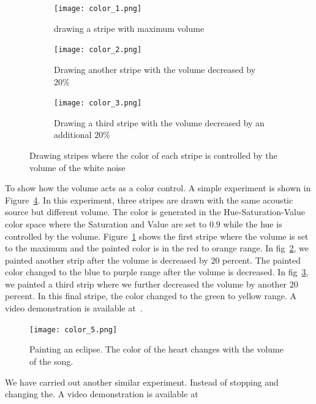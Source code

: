 \begin{figure}[h!]
\centering
  \begin{subfigure}[]{.48\textwidth}
    \texttt{[image: color\_1.png]}
    \caption{drawing a stripe with maximum volume}
    \label{fig:show_color_1_1}
  \end{subfigure}
  \begin{subfigure}[]{.48\textwidth}
    \texttt{[image: color\_2.png]}
    \caption{Drawing another stripe with the volume decreased by $20\%$}
    \label{fig:show_color_1_2}
  \end{subfigure}
  \begin{subfigure}[]{.48\textwidth}
    \texttt{[image: color\_3.png]}
    \caption{Drawing a third stripe with the volume decreased by an additional $20\%$}
    \label{fig:show_color_1_3}
  \end{subfigure}
  \caption{Drawing stripes where the color of each stripe is controlled by the volume of the white noise}
  \label{fig:show_color}
\end{figure}

To show how the volume acts as a color control. A simple experiment is shown in Figure~\ref{fig:show_color}. In this experiment, three stripes are drawn with the same acoustic source but different volume. The color is generated in the Hue-Saturation-Value color space where the Saturation and Value are set to $0.9$ while the hue is controlled by the volume. Figure~\ref{fig:show_color_1_1} shows the first stripe where the volume is set to the maximum and the painted color is in the red to orange range. In fig~\ref{fig:show_color_1_2}, we painted another strip after the volume is decreased by $20$ percent. The painted color changed to the blue to purple range after the volume is decreased. In fig~\ref{fig:show_color_1_3}, we painted a third strip where we further decreased the volume by another $20$ percent. In this final stripe, the color changed to the green to yellow range. A video demonstration is available at~\cite{demo:color}.

\begin{figure}[h!]
  \centering
    \texttt{[image: color\_5.png]}
    \caption{Painting an eclipse. The color of the heart changes with the volume of the song.}
    \label{fig:show_color_3}
\end{figure}

We have carried out another similar experiment. Instead of stopping and changing the. A video demonstration is available at~\cite{demo:color3} 

